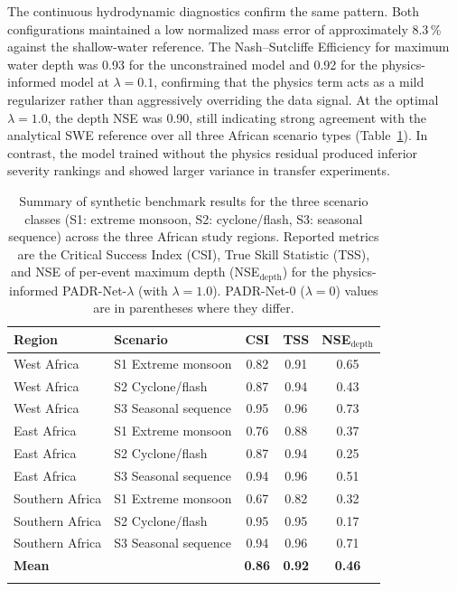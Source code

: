 \documentclass[pdflatex,sn-mathphys-ay]{sn-jnl}
\theoremstyle{thmstyleone}
\theoremstyle{thmstylethree}
\theoremstyle{thmstyletwo}
\begin{document}
The continuous hydrodynamic diagnostics confirm the same pattern.  Both
configurations maintained a low normalized mass error of approximately
8.3\,\% against the shallow-water reference.  The Nash--Sutcliffe
Efficiency for maximum water depth was 0.93 for the unconstrained model
and 0.92 for the physics-informed model at $\lambda=0.1$, confirming
that the physics term acts as a mild regularizer rather than
aggressively overriding the data signal.  At the optimal
$\lambda=1.0$, the depth NSE was 0.90, still indicating strong
agreement with the analytical SWE reference over all three African
scenario types (Table~\ref{tab:scenario_summary}).  In contrast, the
model trained without the physics residual produced inferior severity
rankings and showed larger variance in transfer experiments.

\begin{table}[t]
\centering
\small
\caption{%
  Summary of synthetic benchmark results for the three scenario
  classes (S1: extreme monsoon, S2: cyclone/flash, S3: seasonal
  sequence) across the three African study regions.
  Reported metrics are the Critical Success Index (CSI), True Skill
  Statistic (TSS), and NSE of per-event maximum depth
  (NSE$_\mathrm{depth}$) for the physics-informed PADR-Net-$\lambda$
  (with $\lambda=1.0$).  PADR-Net-0 ($\lambda=0$) values are in
  parentheses where they differ.
}
\label{tab:scenario_summary}
\begin{tabular}{llccc}
\toprule
Region & Scenario & CSI & TSS & NSE$_\mathrm{depth}$ \\
\midrule
West Africa   & S1 Extreme monsoon       & 0.82 & 0.91 & 0.65 \\
West Africa   & S2 Cyclone/flash         & 0.87 & 0.94 & 0.43 \\
West Africa   & S3 Seasonal sequence     & 0.95 & 0.96 & 0.73 \\
East Africa   & S1 Extreme monsoon       & 0.76 & 0.88 & 0.37 \\
East Africa   & S2 Cyclone/flash         & 0.87 & 0.94 & 0.25 \\
East Africa   & S3 Seasonal sequence     & 0.94 & 0.96 & 0.51 \\
Southern Africa & S1 Extreme monsoon     & 0.67 & 0.82 & 0.32 \\
Southern Africa & S2 Cyclone/flash       & 0.95 & 0.95 & 0.17 \\
Southern Africa & S3 Seasonal sequence   & 0.94 & 0.96 & 0.71 \\
\midrule
\textbf{Mean} & & \textbf{0.86} & \textbf{0.92} & \textbf{0.46} \\
\botrule
\end{tabular}
\end{table}
\end{document}

